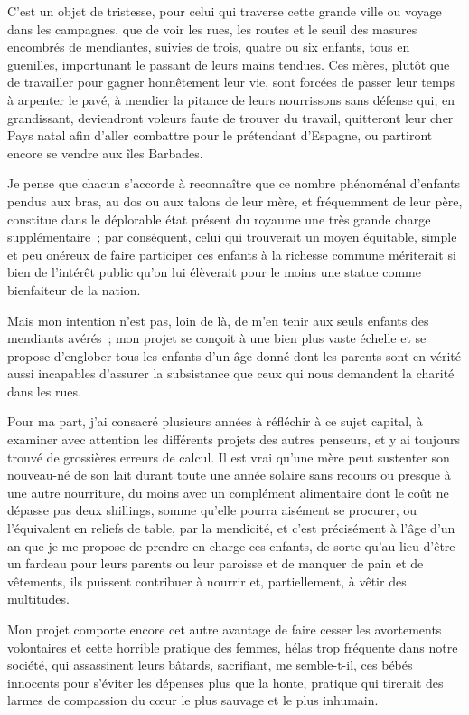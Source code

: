 \documentclass[french,twoside]{book} %
\begin{document}
  \noindent C’est un objet de tristesse, pour celui qui traverse cette grande ville ou voyage dans les campagnes, que de voir les rues, les routes et le seuil des masures encombrés de mendiantes, suivies de trois, quatre ou six enfants, tous en guenilles, importunant le passant de leurs mains tendues. Ces mères, plutôt que de travailler pour gagner honnêtement leur vie, sont forcées de passer leur temps à arpenter le pavé, à mendier la pitance de leurs nourrissons sans défense qui, en grandissant, deviendront voleurs faute de trouver du travail, quitteront leur cher Pays natal afin d’aller combattre pour le prétendant d’Espagne, ou partiront encore se vendre aux îles Barbades.\par
Je pense que chacun s’accorde à reconnaître que ce nombre phénoménal d’enfants pendus aux bras, au dos ou aux talons de leur mère, et fréquemment de leur père, constitue dans le déplorable état présent du royaume une très grande charge supplémentaire ; par conséquent, celui qui trouverait un moyen équitable, simple et peu onéreux de faire participer ces enfants à la richesse commune mériterait si bien de l’intérêt public qu’on lui élèverait pour le moins une statue comme bienfaiteur de la nation.\par
Mais mon intention n’est pas, loin de là, de m’en tenir aux seuls enfants des mendiants avérés ; mon projet se conçoit à une bien plus vaste échelle et se propose d’englober tous les enfants d’un âge donné dont les parents sont en vérité aussi incapables d’assurer la subsistance que ceux qui nous demandent la charité dans les rues.\par
Pour ma part, j’ai consacré plusieurs années à réfléchir à ce sujet capital, à examiner avec attention les différents projets des autres penseurs, et y ai toujours trouvé de grossières erreurs de calcul. Il est vrai qu’une mère peut sustenter son nouveau-né de son lait durant toute une année solaire sans recours ou presque à une autre nourriture, du moins avec un complément alimentaire dont le coût ne dépasse pas deux shillings, somme qu’elle pourra aisément se procurer, ou l’équivalent en reliefs de table, par la mendicité, et c’est précisément à l’âge d’un an que je me propose de prendre en charge ces enfants, de sorte qu’au lieu d’être un fardeau pour leurs parents ou leur paroisse et de manquer de pain et de vêtements, ils puissent contribuer à nourrir et, partiellement, à vêtir des multitudes.\par
Mon projet comporte encore cet autre avantage de faire cesser les avortements volontaires et cette horrible pratique des femmes, hélas trop fréquente dans notre société, qui assassinent leurs bâtards, sacrifiant, me semble-t-il, ces bébés innocents pour s’éviter les dépenses plus que la honte, pratique qui tirerait des larmes de compassion du cœur le plus sauvage et le plus inhumain.\par
\end{document}
